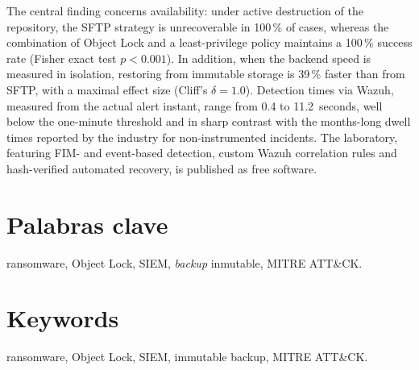 \documentclass[12pt,twoside]{book}
\newcommand\paginablanco{%
    \null\thispagestyle{empty}\newpage}
\begin{document}
The central finding concerns availability: under active destruction of the
repository, the SFTP strategy is unrecoverable in 100\,\% of cases, whereas the
combination of Object Lock and a least-privilege policy maintains a 100\,\% success
rate (Fisher exact test $p < 0.001$). In addition, when the backend speed is
measured in isolation, restoring from immutable storage is 39\,\% faster than from
SFTP, with a maximal effect size (Cliff's $\delta = 1.0$). Detection times via
Wazuh, measured from the actual alert instant, range from 0.4 to 11.2~seconds, well
below the one-minute threshold and in sharp contrast with the months-long dwell
times reported by the industry for non-instrumented incidents. The laboratory,
featuring FIM- and event-based detection, custom Wazuh correlation rules and
hash-verified automated recovery, is published as free software.

\cleardoublepage

\chapter*{Palabras clave}

ransomware, Object Lock, SIEM, \textit{backup} inmutable, MITRE ATT\&CK.

\cleardoublepage

\chapter*{Keywords}

ransomware, Object Lock, SIEM, immutable backup, MITRE ATT\&CK.

\cleardoublepage

\renewcommand{\listtablename}{Índice de tablas}
\renewcommand{\listfigurename}{Índice de figuras}

\tableofcontents
\cleardoublepage

\listoftables
{}
\cleardoublepage

\listoffigures
{}
\cleardoublepage

\printglossary[type=\acronymtype, title={Lista de acrónimos},
               toctitle={Lista de acrónimos}]
\cleardoublepage

\paginablanco{}
\end{document}
